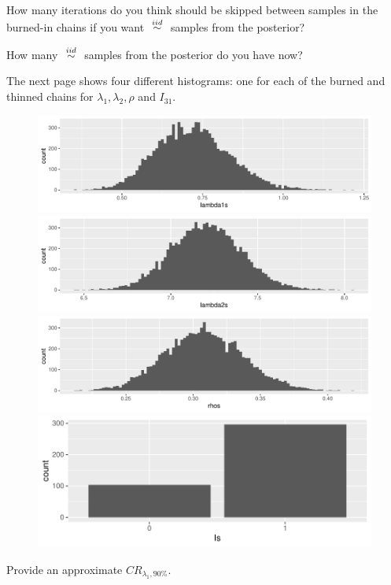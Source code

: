 \documentclass[12pt]{article}
\begin{document}
 How many iterations do you think should be skipped between samples in the burned-in chains if you want $\iid$ samples from the posterior? 

 How many $\iid$ samples from the posterior do you have now? 

The next page shows four different histograms: one for each of the burned and thinned chains for $\lambda_1, \lambda_2, \rho$ and $I_{31}$.

\begin{figure}[h]
\centering
\includegraphics[width=7in]{lambda1s}
\includegraphics[width=7in]{lambda2s}
\includegraphics[width=7in]{rhos}
\includegraphics[width=5in]{I31}
\end{figure}
\FloatBarrier


 Provide an approximate $CR_{\lambda_1, 90\%}$. 
\end{document}
